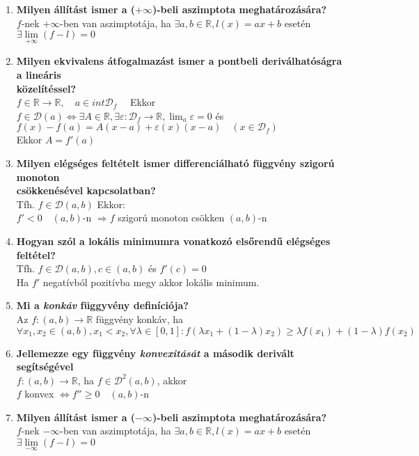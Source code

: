 \documentclass[a4paper,11pt]{article}
\begin{document}
\def\N{\mathbb{N}}
\def\Z{\mathbb{Z}}
\def\R{\mathbb{R}}
\def\rtr{\R\to\R}
\def\D{\mathcal{D}}
\def\cab{\in C[a,b]}
\def\dab{\in\D(a,b)}
\def\fda{f\in\D(a)}
\def\lima{\displaystyle\lim_{a}}
\def\fabr{f:(a,b)\to\R}
\begin{enumerate}
	\item \textbf{Milyen állítást ismer a ($+\infty$)-beli aszimptota meghatározására?}\\[0.1cm] $f$-nek $+\infty$-ben van aszimptotája, ha
	$\exists a,b\in\R,l(x)=ax+b$ esetén $\exists\lim\limits_{+\infty}
	(f-l)=0$
	\item \textbf{Milyen ekvivalens átfogalmazást ismer a pontbeli deriválhatóságra a lineáris \\ közelítéssel?}\\[0.1cm]$f\in\rtr,\quad a\in int\D_f\quad$ Ekkor\\[0.1cm]$\fda\Leftrightarrow\exists A\in\R, \exists\varepsilon:\D_f\to\R,\lima\varepsilon=0$ és $f(x)-f(a)=A(x-a)+ \varepsilon(x)(x-a)\quad(x\in\D_f)$\\[0.1cm]Ekkor $A=f'(a)$
	\item \textbf{Milyen elégséges feltételt ismer differenciálható függvény szigorú monoton \\ csökkenésével kapcsolatban?}\\[0.1cm]Tfh. $f\dab$ Ekkor: \\[0.1cm]\hspace*{0.3cm} $f'<0\quad (a,b)$-n $\Rightarrow f$ szigorú monoton csökken $(a,b)$-n
	\item \textbf{Hogyan szól a lokális minimumra vonatkozó elsőrendű elégséges feltétel?}\\[0.1cm]Tfh. $f\dab,c\in(a,b)$ és $f'(c)=0$\\[0.1cm]Ha $f'$ negatívból pozitívba megy akkor lokális minimum.
	\item \textbf{Mi a \textit{konkáv} függyvény definíciója?}\\[0.1cm]
	Az $\fabr$ függvény konkáv, ha\\[0.1cm]
	$\forall x_1,x_2\in(a,b),x_1<x_2,\forall\lambda\in[0,1]:f(\lambda
	x_1+(1-\lambda)x_2)\geq\lambda f(x_1)+(1-\lambda)f(x_2)$
	\item \textbf{Jellemezze egy függvény \textit{konvexitását} a második derivált segítségével}\\[0.1cm]
	$\fabr$, ha $f\in\D^2(a,b)$, akkor\\[0.1cm]
	$f$ konvex $\Leftrightarrow f''\geq0\quad(a,b)$-n
	\item \textbf{Milyen állítást ismer a ($-\infty$)-beli aszimptota meghatározására?}\\[0.1cm] $f$-nek $-\infty$-ben van aszimptotája, ha
	$\exists a,b\in\R,l(x)=ax+b$ esetén $\exists\lim\limits_{-\infty}
	(f-l)=0$
\end{enumerate}
\end{document}
